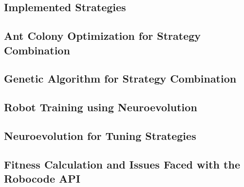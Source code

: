 \subsection{Implemented Strategies}


\subsection{Ant Colony Optimization for Strategy Combination}


\subsection{Genetic Algorithm for Strategy Combination}


\subsection{Robot Training using Neuroevolution}


\subsection{Neuroevolution for Tuning Strategies}


\subsection{Fitness Calculation and Issues Faced with the Robocode API}


